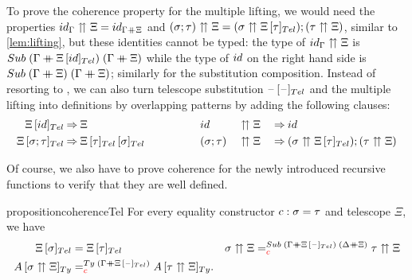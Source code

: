 \documentclass[a4paper,UKenglish,numberwithinsect,cleveref,thm-restate]{lipics-v2021}
\newcommand{\danger}{\marginpar[\hfill\dbend]{\dbend\hfill}}
\begin{document}
To prove the coherence property for the multiple lifting, we would need the properties $\idS_\Gamma \upuparrows \Xi = \idS_{\Gamma \dplus  \Xi}$ and $(\sigma; \tau) \upuparrows \Xi = (\sigma\upuparrows \subTel{\Xi}{\tau}); (\tau \upuparrows \Xi)$, similar to \cref{lem:lifting}, but these identities cannot be typed: the type of $\idS_{\Gamma} \upuparrows \Xi$ is $\Sub\;(\Gamma \dplus \subTel{\Xi}{\idS})\;(\Gamma \dplus \Xi)$ while the type of $\idS$ on the right hand side is $\Sub\;(\Gamma \dplus \Xi)\;(\Gamma \dplus \Xi)$; similarly for the substitution composition.
%
Instead of resorting to \transp, we can also turn telescope substitution $\subTel{\blank}{\blank}$ and the multiple lifting into definitions by overlapping patterns by adding the following clauses:
\begin{alignat*}{9}
  \subTel{\Xi}{\idS}          & \reduce \Xi\qquad\qquad
                              && \idS          && \upuparrows \Xi && \reduce \idS \\
  \subTel{\Xi}{\sigma ; \tau} & \reduce \subTel{\subTel{\Xi}{\tau}}{\sigma} \qquad\qquad
                              && (\sigma;\tau) && \upuparrows \Xi && \reduce (\sigma \upuparrows \subTel{\Xi}{\tau}) ; (\tau \upuparrows \Xi)
\end{alignat*}

Of course, we also have to prove coherence for the newly introduced recursive functions to verify that they are well defined.

\begin{restatable}%
{proposition}{coherenceTel}
  For every equality constructor $\cc : \sigma = \tau$ and telescope $\Xi$, we have
  \danger
  \begin{align*}
    \subTel{\Xi}{\sigma} & = \subTel{\Xi}{\tau}
                         && \sigma \upuparrows \Xi =^{\Sub\;(\Gamma\dplus \subTel{\Xi}{\blank})\;(\Delta\dplus\Xi)}_{\alert{\cc}} \tau \upuparrows \Xi \\
    \subTy{A}{\sigma \upuparrows \Xi} & =^{\Ty\;(\Gamma \dplus \subTel{\Xi}{\blank})}_{\alert{\cc}} \subTy{A}{\tau \upuparrows \Xi}.
  \end{align*}
\end{restatable}
\end{document}
